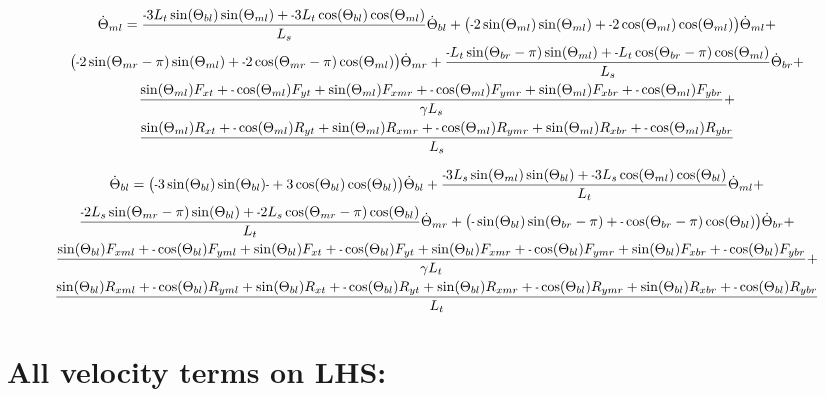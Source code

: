 \documentclass[11pt, landscape]{article}
\newcommand{\mn}{\scalebox{0.7}[1.0]{-}}
\begin{document}
\begin{multline}
\dot{\Theta}_{ml} =
\frac{\mn 3L_{t}\sin(\Theta_{bl})\sin(\Theta_{ml}) + \mn3L_{t}\cos(\Theta_{bl})\cos(\Theta_{ml})}{L_s}\dot{\Theta}_{bl} + 
\big(\mn 2\sin(\Theta_{ml})\sin(\Theta_{ml}) + \mn 2\cos(\Theta_{ml})\cos(\Theta_{ml}) \big)\dot{\Theta}_{ml} + \\
\big(\mn 2\sin(\Theta_{mr}-\pi)\sin(\Theta_{ml}) + \mn 2\cos(\Theta_{mr}-\pi)\cos(\Theta_{ml}) \big)\dot{\Theta}_{mr} + 
\frac{\mn L_{t}\sin(\Theta_{br}-\pi)\sin(\Theta_{ml}) + \mn L_{t}\cos(\Theta_{br}-\pi)\cos(\Theta_{ml})}{L_s}\dot{\Theta}_{br} + \\
\frac{\sin(\Theta_{ml})F_{xt } + \mn \cos(\Theta_{ml})F_{yt } + \sin(\Theta_{ml})F_{xmr} + \mn \cos(\Theta_{ml})F_{ymr} + \sin(\Theta_{ml})F_{xbr} + \mn \cos(\Theta_{ml})F_{ybr}}{\gamma L_s} + \\
\frac{\sin(\Theta_{ml})R_{xt } + \mn \cos(\Theta_{ml})R_{yt } + \sin(\Theta_{ml})R_{xmr} + \mn \cos(\Theta_{ml})R_{ymr} + \sin(\Theta_{ml})R_{xbr} + \mn \cos(\Theta_{ml})R_{ybr}}{L_s}
\end{multline}



\begin{multline}
\dot{\Theta}_{bl} =
\big(\mn 3\sin(\Theta_{bl})\sin(\Theta_{bl})\mn + 3\cos(\Theta_{bl})\cos(\Theta_{bl}) \big)\dot{\Theta}_{bl} +
\frac{\mn 3L_{s}\sin(\Theta_{ml})\sin(\Theta_{bl}) + \mn 3L_{s}\cos(\Theta_{ml})\cos(\Theta_{bl})}{L_t}\dot{\Theta}_{ml} + \\
\frac{\mn 2L_{s}\sin(\Theta_{mr}-\pi)\sin(\Theta_{bl}) + \mn 2L_{s}\cos(\Theta_{mr}-\pi)\cos(\Theta_{bl})}{L_t}\dot{\Theta}_{mr} +
\big(\mn \sin(\Theta_{bl}) \sin(\Theta_{br}-\pi) + \mn \cos(\Theta_{br}-\pi)\cos(\Theta_{bl})\big) \dot{\Theta}_{br} + \\
\frac{\sin(\Theta_{bl})F_{xml} + \mn\cos(\Theta_{bl})F_{yml} + \sin(\Theta_{bl})F_{xt } + \mn \cos(\Theta_{bl})F_{yt } + \sin(\Theta_{bl})F_{xmr} + \mn \cos(\Theta_{bl})F_{ymr} + \sin(\Theta_{bl})F_{xbr} + \mn \cos(\Theta_{bl})F_{ybr}}{\gamma L_t} + \\
\frac{\sin(\Theta_{bl})R_{xml} + \mn \cos(\Theta_{bl})R_{yml} + \sin(\Theta_{bl})R_{xt } + \mn \cos(\Theta_{bl})R_{yt} + \sin(\Theta_{bl})R_{xmr} + \mn \cos(\Theta_{bl})R_{ymr} + \sin(\Theta_{bl})R_{xbr} + \mn \cos(\Theta_{bl})R_{ybr}}{L_t}
\end{multline}

\section{All velocity terms on LHS:}
\end{document}
